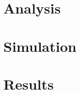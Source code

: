 \documentclass[12pt,onecolumn,reqno]{amsart}
\begin{document}
\section{Analysis}


\section{Simulation}


\section{Results}




\end{document}

